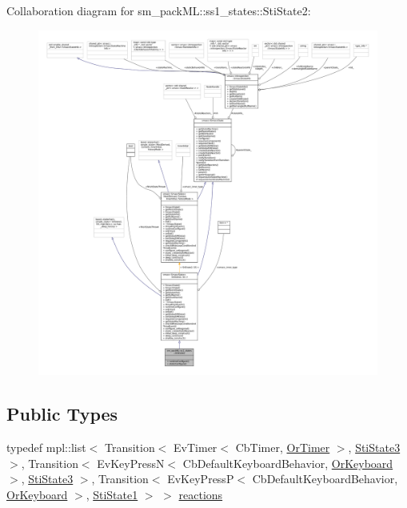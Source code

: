 Collaboration diagram for sm\+\_\+pack\+ML\+:\+:ss1\+\_\+states\+:\+:Sti\+State2\+:
\nopagebreak
\begin{figure}[H]
\begin{center}
\leavevmode
\includegraphics[width=350pt]{structsm__packML_1_1ss1__states_1_1StiState2__coll__graph}
\end{center}
\end{figure}
\subsection*{Public Types}
\begin{DoxyCompactItemize}
\item 
typedef mpl\+::list$<$ Transition$<$ Ev\+Timer$<$ Cb\+Timer, \hyperlink{classsm__packML_1_1OrTimer}{Or\+Timer} $>$, \hyperlink{structsm__packML_1_1ss1__states_1_1StiState3}{Sti\+State3} $>$, Transition$<$ Ev\+Key\+PressN$<$ Cb\+Default\+Keyboard\+Behavior, \hyperlink{classsm__packML_1_1OrKeyboard}{Or\+Keyboard} $>$, \hyperlink{structsm__packML_1_1ss1__states_1_1StiState3}{Sti\+State3} $>$, Transition$<$ Ev\+Key\+PressP$<$ Cb\+Default\+Keyboard\+Behavior, \hyperlink{classsm__packML_1_1OrKeyboard}{Or\+Keyboard} $>$, \hyperlink{structsm__packML_1_1ss1__states_1_1StiState1}{Sti\+State1} $>$ $>$ \hyperlink{structsm__packML_1_1ss1__states_1_1StiState2_a8546078af2aba8703624ce61b75ea146}{reactions}
\end{DoxyCompactItemize}
